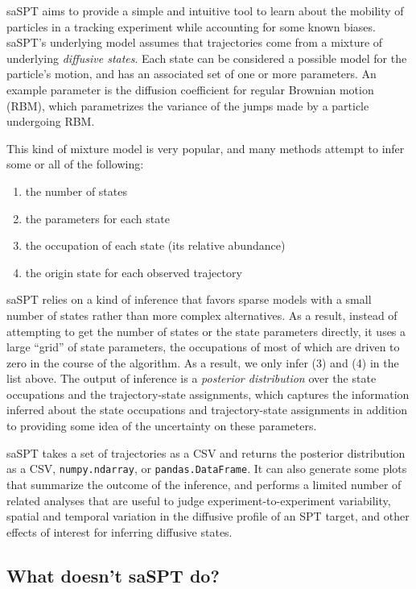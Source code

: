 \documentclass{article}
\begin{document}
saSPT aims to provide a simple and intuitive tool to learn about
the mobility of particles in a tracking experiment while accounting
for some known biases. saSPT's underlying model assumes that 
trajectories come from a mixture of underlying \emph{diffusive states}.
Each state can be considered a possible model for the particle's motion,
and has an associated set of one or more parameters. 
An example parameter is the diffusion coefficient for regular
Brownian motion (RBM), which parametrizes the variance of the jumps made by 
a particle undergoing RBM.

This kind of mixture model is very popular, and many methods attempt to 
infer some or all of the following:
\begin{enumerate}
    \item the number of states
    \item the parameters for each state
    \item the occupation of each state (its relative abundance)
    \item the origin state for each observed trajectory
\end{enumerate}

saSPT relies on a kind of inference that favors sparse models with a 
small number of states rather than more complex alternatives. 
As a result, instead of attempting to get the number of states or
the state parameters directly, it uses a large ``grid'' of state
parameters, the occupations of most of which are driven to zero in 
the course of the algorithm. As a result, we only infer (3) and (4)
in the list above. The output of inference is a \emph{posterior distribution}
over the state occupations and the trajectory-state assignments, which 
captures the information inferred about the state occupations and 
trajectory-state assignments in addition to providing some idea of the 
uncertainty on these parameters.

saSPT takes a set of trajectories as a CSV and returns 
the posterior distribution as a CSV, \verb|numpy.ndarray|, or 
\verb|pandas.DataFrame|. It can also generate some plots that summarize
the outcome of the inference, and performs a limited number of related
analyses that are useful to judge experiment-to-experiment variability,
spatial and temporal variation in the diffusive profile of an SPT 
target, and other effects of interest for inferring diffusive states.

\subsection{What doesn't saSPT do?}
\end{document}
